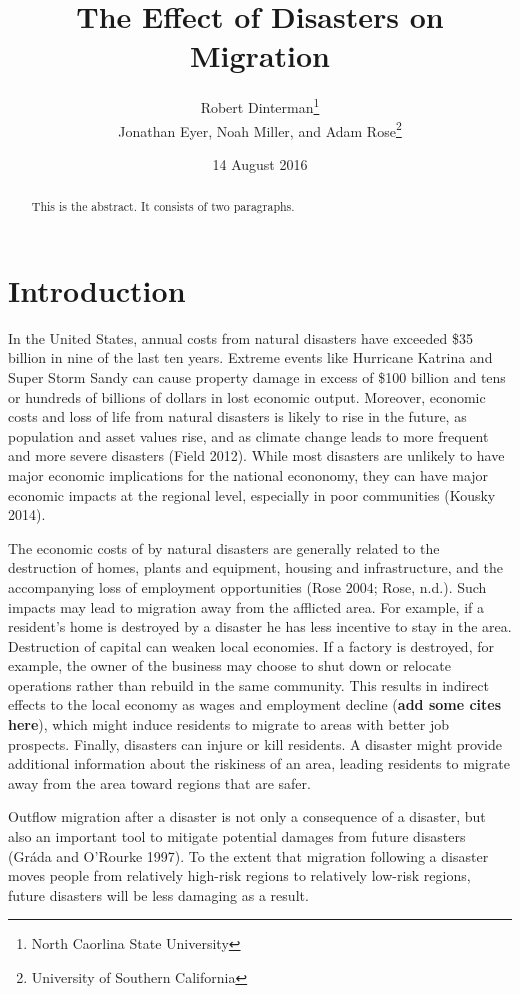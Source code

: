 \documentclass[]{article}
\title{The Effect of Disasters on Migration}
\author{Robert Dinterman\footnote{North Caorlina State University} \\ Jonathan Eyer, Noah Miller, and Adam Rose\footnote{University of
  Southern California}}
\date{14 August 2016}
\begin{document}
\maketitle
\begin{abstract}
This is the abstract. It consists of two paragraphs.
\end{abstract}

\section{Introduction}\label{introduction}

In the United States, annual costs from natural disasters have exceeded
\$35 billion in nine of the last ten years. Extreme events like
Hurricane Katrina and Super Storm Sandy can cause property damage in
excess of \$100 billion and tens or hundreds of billions of dollars in
lost economic output. Moreover, economic costs and loss of life from
natural disasters is likely to rise in the future, as population and
asset values rise, and as climate change leads to more frequent and more
severe disasters (Field 2012). While most disasters are unlikely to have
major economic implications for the national econonomy, they can have
major economic impacts at the regional level, especially in poor
communities (Kousky 2014).

The economic costs of by natural disasters are generally related to the
destruction of homes, plants and equipment, housing and infrastructure,
and the accompanying loss of employment opportunities (Rose 2004; Rose,
n.d.). Such impacts may lead to migration away from the afflicted area.
For example, if a resident's home is destroyed by a disaster he has less
incentive to stay in the area. Destruction of capital can weaken local
economies. If a factory is destroyed, for example, the owner of the
business may choose to shut down or relocate operations rather than
rebuild in the same community. This results in indirect effects to the
local economy as wages and employment decline (\textbf{add some cites
here}), which might induce residents to migrate to areas with better job
prospects. Finally, disasters can injure or kill residents. A disaster
might provide additional information about the riskiness of an area,
leading residents to migrate away from the area toward regions that are
safer.

Outflow migration after a disaster is not only a consequence of a
disaster, but also an important tool to mitigate potential damages from
future disasters (Gráda and O'Rourke 1997). To the extent that migration
following a disaster moves people from relatively high-risk regions to
relatively low-risk regions, future disasters will be less damaging as a
result.
\end{document}
